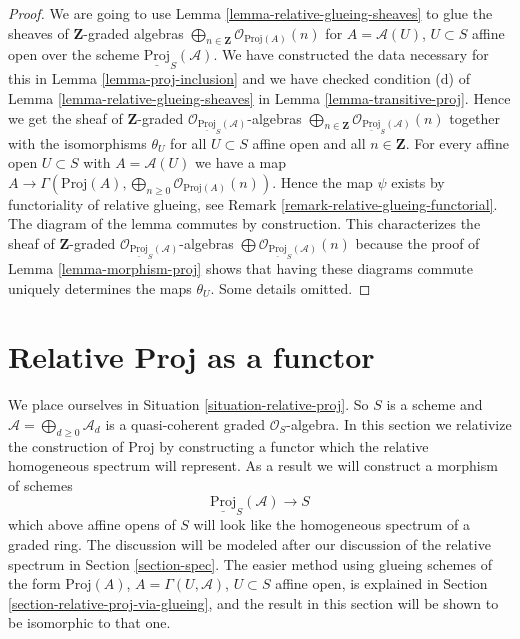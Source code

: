 \begin{proof}
We are going to use Lemma \ref{lemma-relative-glueing-sheaves}
to glue the sheaves of $\mathbf{Z}$-graded algebras
$\bigoplus_{n \in \mathbf{Z}} \mathcal{O}_{\text{Proj}(A)}(n)$
for $A = \mathcal{A}(U)$, $U \subset S$ affine open
over the scheme $\underline{\text{Proj}}_S(\mathcal{A})$.
We have constructed the data necessary for this in
Lemma \ref{lemma-proj-inclusion} and we have checked condition (d) of
Lemma \ref{lemma-relative-glueing-sheaves} in
Lemma \ref{lemma-transitive-proj}. Hence we get the
sheaf of $\mathbf{Z}$-graded
$\mathcal{O}_{\underline{\text{Proj}}_S(\mathcal{A})}$-algebras
$\bigoplus_{n \in \mathbf{Z}}
\mathcal{O}_{\underline{\text{Proj}}_S(\mathcal{A})}(n)$
together with the isomorphisms $\theta_U$ for all
$U \subset S$ affine open and all $n \in \mathbf{Z}$.
For every affine open $U \subset S$ with $A = \mathcal{A}(U)$ we have a map
$A \to \Gamma(\text{Proj}(A),
\bigoplus_{n \geq 0} \mathcal{O}_{\text{Proj}(A)}(n))$.
Hence the map $\psi$ exists by functoriality
of relative glueing, see Remark \ref{remark-relative-glueing-functorial}.
The diagram of the lemma commutes by construction.
This characterizes the sheaf of $\mathbf{Z}$-graded
$\mathcal{O}_{\underline{\text{Proj}}_S(\mathcal{A})}$-algebras
$\bigoplus \mathcal{O}_{\underline{\text{Proj}}_S(\mathcal{A})}(n)$
because the proof of Lemma \ref{lemma-morphism-proj} shows that
having these diagrams commute uniquely determines the maps $\theta_U$.
Some details omitted.
\end{proof}















\section{Relative Proj as a functor}
\label{section-relative-proj}

\noindent
We place ourselves in Situation \ref{situation-relative-proj}.
So $S$ is a scheme and $\mathcal{A} = \bigoplus_{d \geq 0} \mathcal{A}_d$
is a quasi-coherent graded $\mathcal{O}_S$-algebra.
In this section we relativize the construction of
$\text{Proj}$ by constructing a functor which the relative
homogeneous spectrum will represent.
As a result we will construct a morphism of schemes
$$
\underline{\text{Proj}}_S(\mathcal{A}) \longrightarrow S
$$
which above affine opens of $S$ will look like the homogeneous spectrum
of a graded ring. The discussion will be modeled after our
discussion of the relative spectrum in Section \ref{section-spec}.
The easier method using glueing schemes of the form
$\text{Proj}(A)$, $A = \Gamma(U, \mathcal{A})$, $U \subset S$
affine open, is explained in Section \ref{section-relative-proj-via-glueing},
and the result in this section will be shown to be isomorphic to that one.

